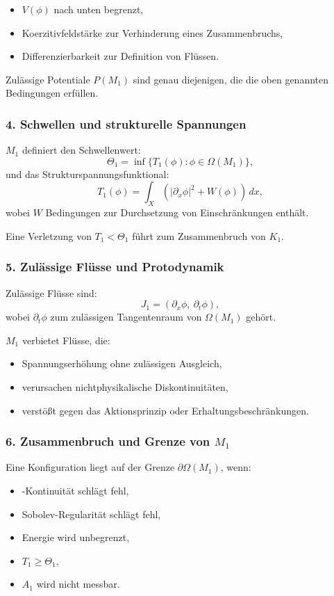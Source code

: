 \begin{itemize}
    \item $V(\phi)$ nach unten begrenzt,
    \item Koerzitivfeldstärke zur Verhinderung eines Zusammenbruchs,
    \item Differenzierbarkeit zur Definition von Flüssen.
\end{itemize}

Zulässige Potentiale $P(M_1)$ sind genau diejenigen, die die oben genannten Bedingungen erfüllen.

\subsubsection*{4. Schwellen und strukturelle Spannungen}

$M_1$ definiert den Schwellenwert:
\[
\Theta_1 = \inf \{ T_1(\phi) : \phi \in \Omega(M_1) \},
\]
und das Strukturspannungsfunktional:
\[
T_1(\phi) =
\int_X \left(
|\partial_x \phi|^2 + W(\phi)
\right)\, dx,
\]
wobei $W$ Bedingungen zur Durchsetzung von Einschränkungen enthält.

Eine Verletzung von $T_1 < \Theta_1$ führt zum Zusammenbruch von $K_1$.

\subsubsection*{5. Zulässige Flüsse und Protodynamik}

Zulässige Flüsse sind:
\[
J_1 = (\partial_x \phi,\ \partial_t \phi),
\]
wobei $\partial_t\phi$ zum zulässigen Tangentenraum von $\Omega(M_1)$ gehört.

$M_1$ verbietet Flüsse, die:
\begin{itemize}
    \item Spannungserhöhung ohne zulässigen Ausgleich,
    \item verursachen nichtphysikalische Diskontinuitäten,
    \item verstößt gegen das Aktionsprinzip oder Erhaltungsbeschränkungen.
\end{itemize}

\subsubsection*{6. Zusammenbruch und Grenze von \texorpdfstring{$M_1$}{M_1}}

Eine Konfiguration liegt auf der Grenze $\partial\Omega(M_1)$, wenn:

\begin{itemize}
    \item-Kontinuität schlägt fehl,
    \item Sobolev-Regularität schlägt fehl,
    \item Energie wird unbegrenzt,
    \item $T_1 \ge \Theta_1$,
    \item $A_1$ wird nicht messbar.
\end{itemize}

